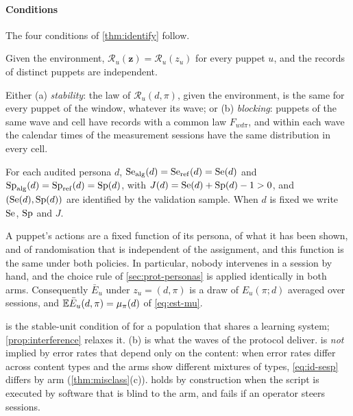 \paragraph{Conditions}
The four conditions of \cref{thm:identify} follow.

\begin{assumption}\label{asm:id-nointerf}
Given the environment, $\mathcal R_u(\bm z)=\mathcal R_u(z_u)$ for every puppet $u$, and the records of distinct puppets are independent.
\end{assumption}

\begin{assumption}\label{asm:id-stable}
Either (a) \emph{stability}: the law of $\mathcal R_u(d,\pi)$, given the environment, is the same for every puppet of the window, whatever its wave; or (b) \emph{blocking}: puppets of the same wave and cell have records with a common law $F_{wd\pi}$, and within each wave the calendar times of the measurement sessions have the same distribution in every cell.
\end{assumption}

\begin{assumption}\label{asm:id-nondiff}
For each audited persona $d$, $\mathrm{Se}_{\mathrm{alg}}(d)=\mathrm{Se}_{\mathrm{ref}}(d)=\mathrm{Se}(d)$ and $\mathrm{Sp}_{\mathrm{alg}}(d)=\mathrm{Sp}_{\mathrm{ref}}(d)=\mathrm{Sp}(d)$, with $J(d)=\mathrm{Se}(d)+\mathrm{Sp}(d)-1>0$, and $(\mathrm{Se}(d),\mathrm{Sp}(d))$ are identified by the validation sample. When $d$ is fixed we write $\mathrm{Se}$, $\mathrm{Sp}$ and $J$.
\end{assumption}

\begin{assumption}\label{asm:id-script}
A puppet's actions are a fixed function of its persona, of what it has been shown, and of randomisation that is independent of the assignment, and this function is the same under both policies. In particular, nobody intervenes in a session by hand, and the choice rule of \cref{sec:prot-personas} is applied identically in both arms. Consequently $\bar E_u$ under $z_u=(d,\pi)$ is a draw of $E_u(\pi;d)$ averaged over sessions, and $\mathbb{E}\bar E_u(d,\pi)=\mu_\pi(d)$ of \eqref{eq:est-mu}.
\end{assumption}

 is the stable-unit condition of \citet{rubin1974} for a population that shares a learning system; \cref{prop:interference} relaxes it. (b) is what the waves of the protocol deliver.  is \emph{not} implied by error rates that depend only on the content: when error rates differ across content types and the arms show different mixtures of types, \eqref{eq:id-sesp} differs by arm (\cref{thm:misclass}(c)).  holds by construction when the script is executed by software that is blind to the arm, and fails if an operator steers sessions.

